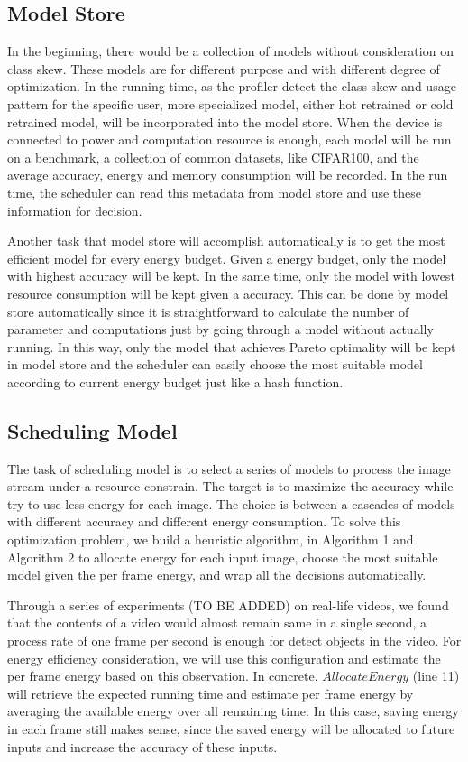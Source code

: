 \documentclass{article}
\begin{document}
\subsection{Model Store}
In the beginning, there would be a collection of models without consideration on class skew. These models are for different purpose and with different degree of optimization. In the running time, as the profiler detect the class skew and usage pattern for the specific user, more specialized model, either hot retrained or cold retrained model, will be incorporated into the model store. When the device is connected to power and computation resource is enough, each model will be run on a benchmark, a collection of common datasets, like CIFAR100, and the average accuracy, energy and memory consumption will be recorded. In the run time, the scheduler can read this metadata from model store and use these information for decision. 

Another task that model store will accomplish automatically is to get the most efficient model for every energy budget. Given a energy budget, only the model with highest accuracy will be kept. In the same time, only the model with lowest resource consumption will be kept given a accuracy. This can be done by model store automatically since it is straightforward to calculate the number of parameter and computations just by going through a model without actually running. In this way, only the model that achieves Pareto optimality will be kept in model store and the scheduler can easily choose the most suitable model according to current energy budget just like a hash function.


\subsection{Scheduling Model}
The task of scheduling model is to select a series of models to process the image stream under a resource constrain. The target is to maximize the accuracy while try to use less energy for each image. The choice is between a cascades of models with different accuracy and different energy consumption. To solve this optimization problem, we build a heuristic algorithm, in Algorithm 1 and Algorithm 2 to allocate energy for each input image, choose the most suitable model given the per frame energy, and wrap all the decisions automatically.


Through a series of experiments (TO BE ADDED) on real-life videos, we found that the contents of a video would almost remain same in a single second, a process rate of one frame per second is enough for detect objects in the video. For energy efficiency consideration, we will use this configuration and estimate the per frame energy based on this observation. In concrete, $AllocateEnergy$ (line 11) will retrieve the expected running time and estimate per frame energy by averaging the available energy over all remaining time. In this case, saving energy in each frame still makes sense, since the saved energy will be allocated to future inputs and increase the accuracy of these inputs.
\end{document}
